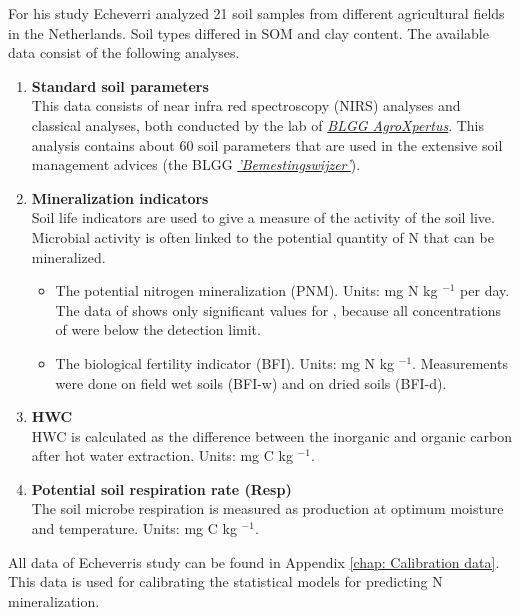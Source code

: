 \documentclass[10pt,twoside,dutch,english]{report}
\begin{document}
For his study Echeverri analyzed 21 soil samples from different agricultural fields in the Netherlands. Soil types differed in SOM and clay content. 
The available data consist of the following analyses. 

	\begin{enumerate}
	\item \textbf{Standard soil parameters} \\
	This data consists of near infra red spectroscopy (NIRS) analyses and classical analyses, both conducted by the lab of \href{http://blgg.agroxpertus.nl/}{\textit{BLGG AgroXpertus}}. This analysis contains about 60 soil parameters that are used in the extensive soil management advices (the BLGG \href{http://blgg.agroxpertus.nl/product/bemesting/bemestingswijzer-bouwland}{\textit{'Bemestingswijzer'}}). 
	
	\item \textbf{Mineralization indicators}\\
	Soil life indicators are used to give a measure of the activity of the soil live. Microbial activity is often linked to the potential quantity of N that can be mineralized. 
	\begin{itemize}
		\item The potential nitrogen mineralization (PNM).  Units: mg N kg $^{-1}$ per day. The data of \citep{Echeverri2014} shows only significant values for , because all concentrations of  were below the detection limit. 
		\item The biological fertility indicator (BFI). Units: mg N kg $^{-1}$. Measurements were done on field wet soils (BFI-w) and on dried soils (BFI-d). 
	\end{itemize}
	
	\item \textbf{HWC} \\
	HWC is calculated as the difference between the inorganic and organic carbon after hot water extraction. Units: mg C kg $^{-1}$.   
	
	\item \textbf{Potential soil respiration rate (Resp)}\\
	The soil microbe respiration is measured as  production at optimum moisture and temperature. Units: mg C kg $^{-1}$.   
\end{enumerate}

All data of Echeverris study can be found in Appendix \autoref{chap: Calibration data}. This data is used for calibrating the statistical models for predicting N mineralization.  
\end{document}
